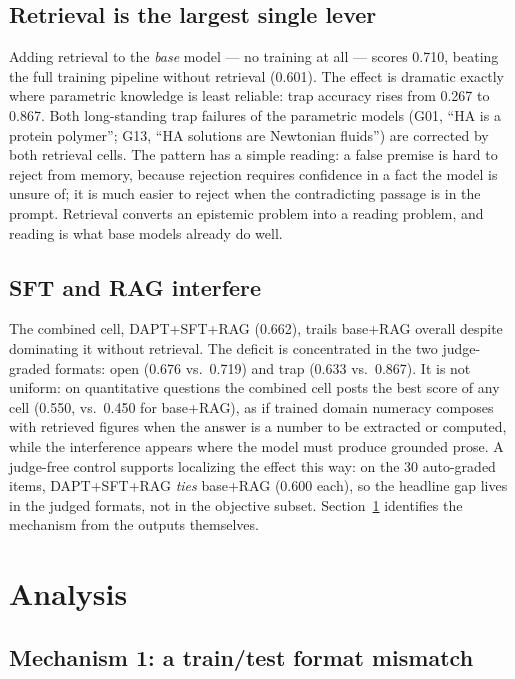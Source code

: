 \documentclass[11pt]{article}
\begin{document}
\subsection{Retrieval is the largest single lever}

Adding retrieval to the \emph{base} model --- no training at all ---
scores 0.710, beating the full training pipeline without retrieval
(0.601). The effect is dramatic exactly where parametric knowledge is
least reliable: trap accuracy rises from 0.267 to 0.867. Both
long-standing trap failures of the parametric models (G01, ``HA is a
protein polymer''; G13, ``HA solutions are Newtonian fluids'') are
corrected by both retrieval cells. The pattern has a simple reading: a
false premise is hard to reject from memory, because rejection requires
confidence in a fact the model is unsure of; it is much easier to reject
when the contradicting passage is in the prompt. Retrieval converts an
epistemic problem into a reading problem, and reading is what base models
already do well.

\subsection{SFT and RAG interfere}

The combined cell, DAPT+SFT+RAG (0.662), trails base+RAG overall despite
dominating it without retrieval. The deficit is concentrated in the two
judge-graded formats: open (0.676 vs.\ 0.719) and trap (0.633
vs.\ 0.867). It is not uniform: on quantitative questions the combined
cell posts the best score of any cell (0.550, vs.\ 0.450 for base+RAG),
as if trained domain numeracy composes with retrieved figures when the
answer is a number to be extracted or computed, while the interference
appears where the model must produce grounded prose. A judge-free control
supports localizing the effect this way: on the 30 auto-graded items,
DAPT+SFT+RAG \emph{ties} base+RAG (0.600 each), so the headline gap lives
in the judged formats, not in the objective subset. Section~\ref{sec:analysis}
identifies the mechanism from the outputs themselves.

\section{Analysis}
\label{sec:analysis}

\subsection{Mechanism 1: a train/test format mismatch}
\end{document}
